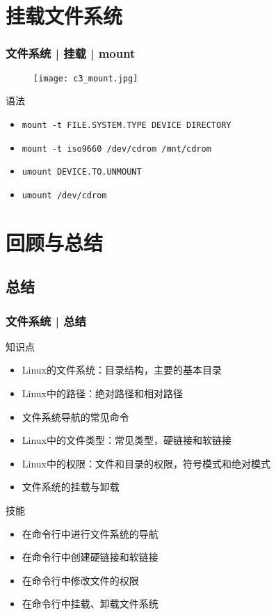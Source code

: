 \section{挂载文件系统}
\begin{frame}[fragile]
  \frametitle{文件系统 | 挂载 | mount }
  \begin{figure}
    \centering
    \texttt{[image: c3\_mount.jpg]}
  \end{figure}
  \pause
  \vspace{-0.3cm}
  \begin{block}{\alert{语法}}
    \begin{itemize}
      \item \verb|mount -t FILE.SYSTEM.TYPE DEVICE DIRECTORY|
      \item \verb|mount -t iso9660 /dev/cdrom /mnt/cdrom|
      \item \verb|umount DEVICE.TO.UNMOUNT|
      \item \verb|umount /dev/cdrom|
    \end{itemize}
  \end{block}
\end{frame}

\section{回顾与总结}
\subsection{总结}
\begin{frame}
  \frametitle{文件系统 | 总结}
  \begin{block}{知识点}
    \begin{itemize}
      \item Linux的文件系统：目录结构，主要的基本目录
      \item Linux中的路径：绝对路径和相对路径
      \item 文件系统导航的常见命令
      \item Linux中的文件类型：常见类型，硬链接和软链接
      \item Linux中的权限：文件和目录的权限，符号模式和绝对模式
      \item 文件系统的挂载与卸载
    \end{itemize}
  \end{block}
  \begin{block}{技能}
    \begin{itemize}
      \item 在命令行中进行文件系统的导航
      \item 在命令行中创建硬链接和软链接
      \item 在命令行中修改文件的权限
      \item 在命令行中挂载、卸载文件系统
    \end{itemize}
  \end{block}
\end{frame}

